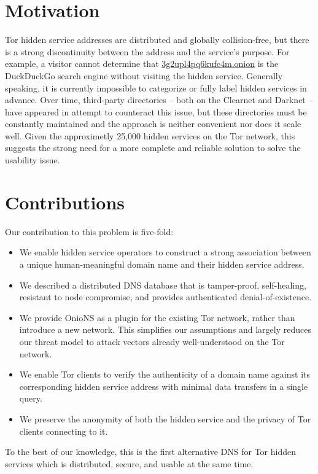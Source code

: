 \section{Motivation}
\label{sec:Motivation}

Tor hidden service addresses are distributed and globally collision-free, but there is a strong discontinuity between the address and the service's purpose. For example, a visitor cannot determine that \url{3g2upl4pq6kufc4m.onion} is the DuckDuckGo search engine without visiting the hidden service. Generally speaking, it is currently impossible to categorize or fully label hidden services in advance. Over time, third-party directories -- both on the Clearnet and Darknet -- have appeared in attempt to counteract this issue, but these directories must be constantly maintained and the approach is neither convenient nor does it scale well. Given the approximetly 25,000 hidden services on the Tor network, this suggests the strong need for a more complete and reliable solution to solve the usability issue.

\section{Contributions}

Our contribution to this problem is five-fold:

\begin{itemize}
	\item We enable hidden service operators to construct a strong association between a unique human-meaningful domain name and their hidden service address.
	\item We described a distributed DNS database that is tamper-proof, self-healing, resistant to node compromise, and provides authenticated denial-of-existence.
	\item We provide OnioNS as a plugin for the existing Tor network, rather than introduce a new network. This simplifies our assumptions and largely reduces our threat model to attack vectors already well-understood on the Tor network.
	\item We enable Tor clients to verify the authenticity of a domain name against its corresponding hidden service address with minimal data transfers in a single query.
	\item We preserve the anonymity of both the hidden service and the privacy of Tor clients connecting to it.
\end{itemize}

To the best of our knowledge, this is the first alternative DNS for Tor hidden services which is distributed, secure, and usable at the same time.

